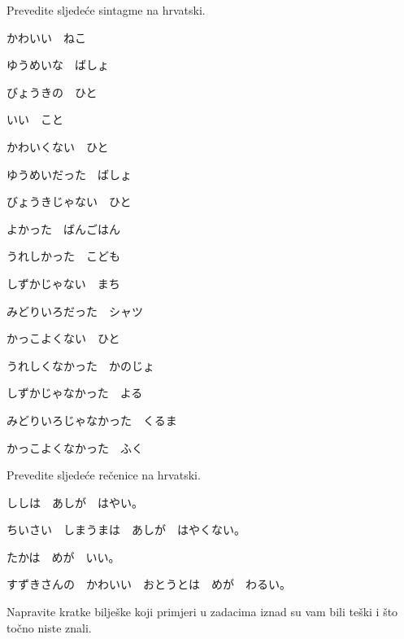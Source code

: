 
\author{autor}

	
	\begin{mondai}{Prevedite sljedeće sintagme na hrvatski.}
		\item かわいい　ねこ
		\item ゆうめいな　ばしょ
		\item びょうきの　ひと
		\item いい　こと
		
		\vspace{5pt}
		\item かわいくない　ひと
		\item ゆうめいだった　ばしょ
		\item びょうきじゃない　ひと
		\item よかった　ばんごはん
		
		\vspace{5pt}
		\item うれしかった　こども
		\item しずかじゃない　まち
		\item みどりいろだった　シャツ
		\item かっこよくない　ひと
		
		\vspace{5pt}
		\item うれしくなかった　かのじょ
		\item しずかじゃなかった　よる
		\item みどりいろじゃなかった　くるま
		\item かっこよくなかった　ふく
	\end{mondai}

	\begin{mondai}{Prevedite sljedeće rečenice na hrvatski.}
		\item ししは　あしが　はやい。
		\item ちいさい　しまうまは　あしが　はやくない。
		\item たかは　めが　いい。
		\item すずきさんの　かわいい　おとうとは　めが　わるい。
	\end{mondai}

	Napravite kratke bilješke koji primjeri u zadacima iznad su vam bili teški i što točno niste znali.

